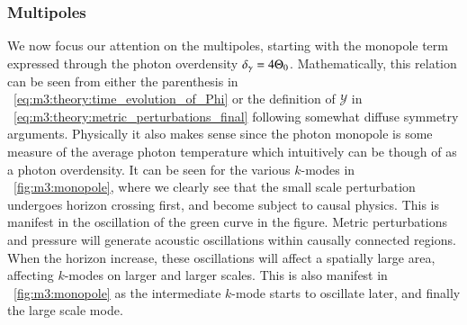 \subsubsection{Multipoles}
    We now focus our attention on the multipoles, starting with the monopole term expressed through the photon overdensity $\delta_\gamma = 4\Theta_0$. Mathematically, this relation can be seen  from either the parenthesis in ~\cref{eq:m3:theory:time_evolution_of_Phi} or the definition of $\mathcal{Y}$ in ~\cref{eq:m3:theory:metric_perturbations_final} following somewhat diffuse symmetry arguments. Physically it also makes sense since the photon monopole is some measure of the average photon temperature which intuitively can be though of as a photon overdensity. It can be seen for the various $k$-modes in ~\cref{fig:m3:monopole}, where we clearly see that the small scale perturbation undergoes horizon crossing first, and become subject to causal physics. This is manifest in the oscillation of the green curve in the figure. Metric perturbations and pressure will generate acoustic oscillations within causally connected regions. When the horizon increase, these oscillations will affect a spatially large area, affecting $k$-modes on larger and larger scales. This is also manifest in ~\cref{fig:m3:monopole} as the intermediate $k$-mode starts to oscillate later, and finally the large scale mode. 

